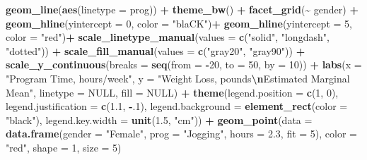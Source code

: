 \documentclass[
]{article}
\newenvironment{Shaded}{\begin{snugshade}}{\end{snugshade}}
\newcommand{\AttributeTok}[1]{\textcolor[rgb]{0.13,0.29,0.53}{#1}}
\newcommand{\ConstantTok}[1]{\textcolor[rgb]{0.56,0.35,0.01}{#1}}
\newcommand{\DecValTok}[1]{\textcolor[rgb]{0.00,0.00,0.81}{#1}}
\newcommand{\FloatTok}[1]{\textcolor[rgb]{0.00,0.00,0.81}{#1}}
\newcommand{\FunctionTok}[1]{\textcolor[rgb]{0.13,0.29,0.53}{\textbf{#1}}}
\newcommand{\NormalTok}[1]{#1}
\newcommand{\SpecialCharTok}[1]{\textcolor[rgb]{0.81,0.36,0.00}{\textbf{#1}}}
\newcommand{\StringTok}[1]{\textcolor[rgb]{0.31,0.60,0.02}{#1}}
\begin{document}
\begin{Shaded}
\begin{Highlighting}[]
  \FunctionTok{geom\_line}\NormalTok{(}\FunctionTok{aes}\NormalTok{(}\AttributeTok{linetype =}\NormalTok{ prog)) }\SpecialCharTok{+}
  \FunctionTok{theme\_bw}\NormalTok{() }\SpecialCharTok{+}
  \FunctionTok{facet\_grid}\NormalTok{(}\SpecialCharTok{\textasciitilde{}}\NormalTok{ gender) }\SpecialCharTok{+}
  \FunctionTok{geom\_hline}\NormalTok{(}\AttributeTok{yintercept =} \DecValTok{0}\NormalTok{,}
             \AttributeTok{color =} \StringTok{"blaCK"}\NormalTok{)}\SpecialCharTok{+}
  \FunctionTok{geom\_hline}\NormalTok{(}\AttributeTok{yintercept =} \DecValTok{5}\NormalTok{,}
             \AttributeTok{color =} \StringTok{"red"}\NormalTok{)}\SpecialCharTok{+}
  \FunctionTok{scale\_linetype\_manual}\NormalTok{(}\AttributeTok{values =} \FunctionTok{c}\NormalTok{(}\StringTok{"solid"}\NormalTok{, }\StringTok{"longdash"}\NormalTok{, }\StringTok{"dotted"}\NormalTok{)) }\SpecialCharTok{+}
  \FunctionTok{scale\_fill\_manual}\NormalTok{(}\AttributeTok{values =} \FunctionTok{c}\NormalTok{(}\StringTok{"gray20"}\NormalTok{, }\StringTok{"gray90"}\NormalTok{)) }\SpecialCharTok{+}
  \FunctionTok{scale\_y\_continuous}\NormalTok{(}\AttributeTok{breaks =} \FunctionTok{seq}\NormalTok{(}\AttributeTok{from =} \SpecialCharTok{{-}}\DecValTok{20}\NormalTok{, }\AttributeTok{to =} \DecValTok{50}\NormalTok{, }\AttributeTok{by =} \DecValTok{10}\NormalTok{)) }\SpecialCharTok{+}
  \FunctionTok{labs}\NormalTok{(}\AttributeTok{x =} \StringTok{"Program Time, hours/week"}\NormalTok{,}
       \AttributeTok{y =} \StringTok{"Weight Loss, pounds}\SpecialCharTok{\textbackslash{}n}\StringTok{Estimated Marginal Mean"}\NormalTok{,}
       \AttributeTok{linetype =} \ConstantTok{NULL}\NormalTok{,}
       \AttributeTok{fill =} \ConstantTok{NULL}\NormalTok{)  }\SpecialCharTok{+}
  \FunctionTok{theme}\NormalTok{(}\AttributeTok{legend.position =} \FunctionTok{c}\NormalTok{(}\DecValTok{1}\NormalTok{, }\DecValTok{0}\NormalTok{),}
        \AttributeTok{legend.justification =} \FunctionTok{c}\NormalTok{(}\FloatTok{1.1}\NormalTok{, }\SpecialCharTok{{-}}\NormalTok{.}\DecValTok{1}\NormalTok{),}
        \AttributeTok{legend.background =} \FunctionTok{element\_rect}\NormalTok{(}\AttributeTok{color =} \StringTok{"black"}\NormalTok{),}
        \AttributeTok{legend.key.width =} \FunctionTok{unit}\NormalTok{(}\FloatTok{1.5}\NormalTok{, }\StringTok{"cm"}\NormalTok{)) }\SpecialCharTok{+}
  \FunctionTok{geom\_point}\NormalTok{(}\AttributeTok{data =} \FunctionTok{data.frame}\NormalTok{(}\AttributeTok{gender =} \StringTok{"Female"}\NormalTok{,}
                               \AttributeTok{prog =} \StringTok{"Jogging"}\NormalTok{,}
                               \AttributeTok{hours =} \FloatTok{2.3}\NormalTok{,}
                               \AttributeTok{fit =} \DecValTok{5}\NormalTok{),}
             \AttributeTok{color =} \StringTok{"red"}\NormalTok{,}
             \AttributeTok{shape =} \DecValTok{1}\NormalTok{,}
             \AttributeTok{size =} \DecValTok{5}\NormalTok{) }
\end{Highlighting}
\end{Shaded}
\end{document}

